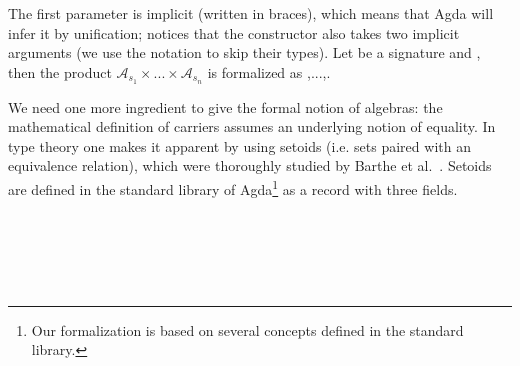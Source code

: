 \noindent The first parameter  is implicit (written in braces), which means that Agda
will infer it by unification; notices that the constructor  also
takes two implicit arguments (we use the notation  to skip their
types). Let  be a signature and  \AgdaSymbol{:}   ,
then the product $\mathcal{A}_{s_1} \times ... \times \mathcal{A}_{s_n}$ is
formalized as   \AgdaSymbol{[} ,...,\AgdaSymbol{]}.

We need one more ingredient to give the formal notion of algebras: the
mathematical definition of carriers assumes an underlying notion of
equality.  In type theory one makes it apparent by using setoids (i.e. 
sets paired with an equivalence relation), which were thoroughly
studied by Barthe et al.~\cite{barthe-setoids-2003}. Setoids are
defined in the standard library \cite{danielsson-agdalib} of
Agda\footnote{Our formalization is based on several concepts defined
  in the standard library.} as a record with three
fields.

\begin{code}
\>[0]\AgdaSpace{}%
\AgdaSpace{}%
\AgdaSymbol{:}\AgdaSpace{}%
\AgdaSpace{}%
\<%
\\
\>[0][@{}l@{\AgdaIndent{0}}]%
\>[2]\<%
\\
\>[2][@{}l@{\AgdaIndent{0}}]%
\>[4]%
\>[18]\AgdaSymbol{:}\AgdaSpace{}%
\<%
\\
%
\>[4]%
\>[18]\AgdaSymbol{:}\AgdaSpace{}%
\AgdaSpace{}%
\AgdaSpace{}%
\AgdaSpace{}%
\AgdaSpace{}%
\<%
\\
%
\>[4]\AgdaSpace{}%
\AgdaSymbol{:}\AgdaSpace{}%
\AgdaSpace{}%
\<%
\end{code}



